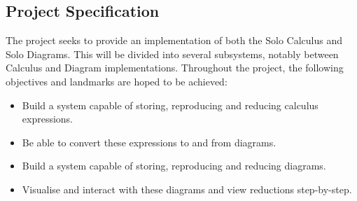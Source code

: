 \subsection{Project Specification}
    
    The project seeks to provide an implementation of both the Solo Calculus and Solo Diagrams.
    This will be divided into several subsystems, notably between Calculus and Diagram implementations.
    Throughout the project, the following objectives and landmarks are hoped to be achieved:

    \begin{itemize}
        \item Build a system capable of storing, reproducing and reducing calculus expressions.
        \item Be able to convert these expressions to and from diagrams.
        \item Build a system capable of storing, reproducing and reducing diagrams.
        \item Visualise and interact with these diagrams and view reductions step-by-step.
    \end{itemize}
